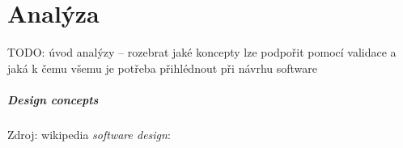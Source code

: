 \chapter{Analýza}




TODO: úvod analýzy -- rozebrat jaké koncepty lze podpořit pomocí validace a jaká k čemu všemu je potřeba přihlédnout při návrhu software

\paragraph{Design concepts} Zdroj: wikipedia \emph{software design}:
